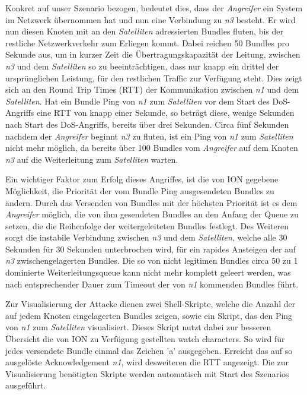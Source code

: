 \documentclass{article}
\begin{document}
Konkret auf unser Szenario bezogen, bedeutet dies, dass der \textit{Angreifer} ein System im Netzwerk übernommen hat und nun eine Verbindung zu \textit{n3} besteht. Er wird nun diesen Knoten mit an den \textit{Satelliten} adressierten Bundles fluten, bis  der restliche Netzwerkverkehr zum Erliegen kommt. Dabei reichen 50 Bundles pro Sekunde aus, um in kurzer Zeit die Übertragungskapazität der Leitung, zwischen \textit{n3} und dem \textit{Satelliten} so zu beeinträchtigen, dass nur knapp ein drittel der ursprünglichen Leistung, für den restlichen Traffic zur Verfügung steht. Dies zeigt sich an den Round Trip Times (RTT) der Kommunikation zwischen \textit{n1} und dem \textit{Satelliten}. Hat ein Bundle Ping von \textit{n1} zum \textit{Satelliten} vor dem Start des DoS-Angriffs eine RTT von knapp einer Sekunde, so beträgt diese, wenige Sekunden nach Start des DoS-Angriffs, bereits über drei Sekunden. Circa fünf Sekunden nachdem der \textit{Angreifer} beginnt \textit{n3} zu fluten, ist ein Ping von \textit{n1} zum \textit{Satelliten} nicht mehr möglich, da bereits über 100 Bundles vom \textit{Angreifer} auf dem Knoten \textit{n3} auf die Weiterleitung zum \textit{Satelliten} warten.\par
Ein wichtiger Faktor zum Erfolg dieses Angriffes, ist die von ION gegebene Möglichkeit, die Priorität der vom Bundle Ping ausgesendeten Bundles zu ändern. Durch das Versenden von Bundles mit der höchsten Priorität ist es dem \textit{Angreifer} möglich, die von ihm gesendeten Bundles an den Anfang der Queue zu setzen, die die Reihenfolge der weitergeleiteten Bundles festlegt. Des Weiteren sorgt die instabile Verbindung zwischen \textit{n3} und dem \textit{Satelliten}, welche alle 30 Sekunden für 30 Sekunden unterbrochen wird, für ein rapides Ansteigen der auf \textit{n3} zwischengelagerten Bundles. Die so von nicht legitimen Bundles circa 50 zu 1 dominierte Weiterleitungsqueue kann nicht mehr komplett geleert werden, was nach entsprechender Dauer zum Timeout der von \textit{n1} kommenden Bundles führt. \par
Zur Visualisierung der Attacke dienen zwei Shell-Skripte, welche  die Anzahl der auf jedem Knoten eingelagerten Bundles zeigen, sowie ein Skript, das den Ping von \textit{n1} zum \textit{Satelliten} visualisiert. Dieses Skript nutzt dabei zur besseren Übersicht die von ION zu Verfügung gestellten watch characters. So wird für jedes versendete Bundle einmal das Zeichen 'a' ausgegeben. Erreicht das auf so ausgelöste Acknowledgement \textit{n1}, wird desweiteren die RTT angezeigt. Die zur Visualisierung benötigten Skripte werden automatisch mit Start des Szenarios ausgeführt.
\end{document}
